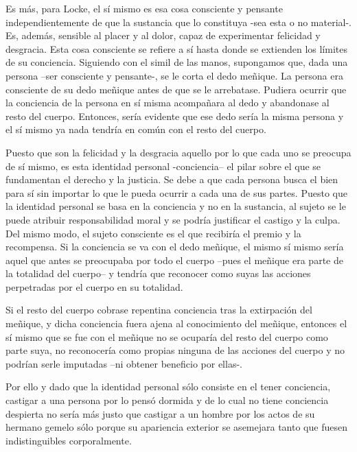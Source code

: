 \documentclass[main.tex]{subfiles}
\begin{document}
	
	

	Es más, para Locke, el sí mismo es esa cosa consciente y pensante independientemente de que la sustancia que lo constituya -sea esta o no material-. Es, además, sensible al placer y al dolor, capaz de experimentar felicidad y desgracia. Esta cosa consciente se refiere a sí hasta donde se extienden los límites de su conciencia. Siguiendo con el simil de las manos, supongamos que, dada una persona –ser consciente y pensante-, se le corta el dedo meñique. La persona era consciente de su dedo meñique antes de que se le arrebatase. Pudiera ocurrir que la conciencia de la persona en sí misma acompañara al dedo y abandonase al resto del cuerpo. Entonces, sería evidente que ese dedo sería la misma persona y el sí mismo ya nada tendría en común con el resto del cuerpo.

	
	
	Puesto que son la felicidad y la desgracia aquello por lo que cada uno se preocupa de sí mismo, es esta identidad personal -conciencia– el pilar sobre el que se fundamentan el derecho y la justicia. Se debe a que cada persona busca el bien para sí sin importar lo que le pueda ocurrir a cada una de sus partes. Puesto que la identidad personal se basa en la conciencia y no en la sustancia, al sujeto se le puede atribuir responsabilidad moral y se podría justificar el castigo y la culpa. Del mismo modo, el sujeto consciente es el que recibiría el premio y la recompensa. Si la conciencia se va con el dedo meñique, el mismo sí mismo sería aquel que antes se preocupaba por todo el cuerpo –pues el meñique era parte de la totalidad del cuerpo– y tendría que reconocer como suyas las acciones perpetradas por el cuerpo en su totalidad.
	
	
	
	Si el resto del cuerpo cobrase repentina conciencia tras la extirpación del meñique, y dicha conciencia fuera ajena al conocimiento del meñique, entonces el sí mismo que se fue con el meñique no se ocuparía del resto del cuerpo como parte suya, no reconocería como propias ninguna de las acciones del cuerpo y no podrían serle imputadas –ni obtener beneficio por ellas-.
	
	
	
	Por ello y dado que la identidad personal sólo consiste en el tener conciencia, castigar a una persona por lo pensó dormida y de lo cual no tiene conciencia despierta no sería más justo que castigar a un hombre por los actos de su hermano gemelo sólo porque su apariencia exterior se asemejara tanto que fuesen indistinguibles corporalmente.
	
\end{document}
